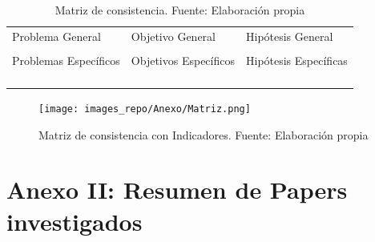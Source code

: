 \begin{table}[h!]
	\centering
	\small
	\begin{tabular}{ |m{5cm}|m{5cm}|m{5cm}|  }
		\hline
		\rowcolor{bluejean}
		\Centering \color{white}{PROBLEMAS}& \Centering \color{white}{OBJETIVOS}& \Centering \color{white}{HIPÓTESIS}\\
		\hline
		\rowcolor{turq}
		\Centering Problema General& \Centering Objetivo General & \Centering Hipótesis General \\
		\hline
		{\ProblemaGeneral} & { \ObjetivoGeneral} & {\HipotesisGeneral} \\
		\hline
		\rowcolor{turq}
		\Centering Problemas Específicos& \Centering Objetivos Específicos & \Centering Hipótesis Específicas \\
		\hline
		{\Pbone} & {\Objone} & {\Hone} \\
		\hline
		{\Pbtwo} & {\Objtwo} & {\Htwo} \\
		\hline
		{\Pbthree} & {\Objthree} & {\Hthree} \\
		\hline
		{\Pbfour} & {\Objfour} & {\Hfour} \\
		\hline
	\end{tabular}
	\caption{Matriz de consistencia. Fuente: Elaboración propia}
	\label{1:table}
\end{table}


\begin{figure}[h]
	\begin{center}
		\texttt{[image: images\_repo/Anexo/Matriz.png]}
		\caption{Matriz de consistencia con Indicadores. Fuente: Elaboración propia}
		\label{1:Matriz de consistencia }
	\end{center}
\end{figure}



\chapter{Anexo II: Resumen de Papers investigados}

